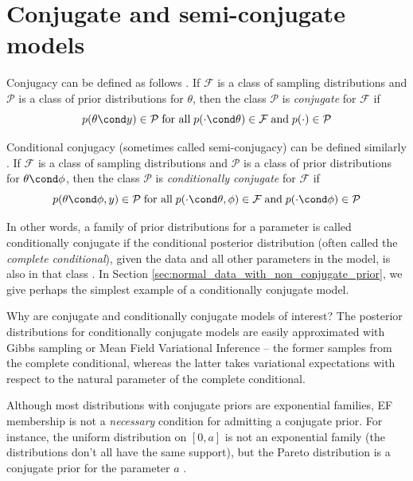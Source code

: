 \documentclass{article} %
\begin{document}
 \section{Conjugate and semi-conjugate models} \label{sec:conjugate_exponential_family_models}
 
Conjugacy can be defined as follows \cite{gelman2013bayesian}. If $\mathcal{F}$ is a class of sampling distributions and $\mathcal{P}$ is a class of prior distributions for $\theta$, then the class $\mathcal{P}$ is \textit{conjugate} for $\mathcal{F}$ if
\[  p(\theta \cond y ) \in \mathcal{P} \; \text{for all} \; p(\cdot \cond \theta) \in \mathcal{F} \; \text{and} \; p(\cdot) \in \mathcal{P} \]

Conditional conjugacy (sometimes called semi-conjugacy) can be defined similarly  \cite{gelman2013bayesian}.  If $\mathcal{F}$ is a class of sampling distributions and $\mathcal{P}$ is a class of prior distributions for $\theta \cond \phi$, then the class $\mathcal{P}$ is \textit{conditionally conjugate} for $\mathcal{F}$ if
\[  p(\theta \cond \phi, y) \in \mathcal{P} \; \text{for all} \; p(\cdot \cond \theta, \phi) \in \mathcal{F} \; \text{and} \; p(\cdot \cond \phi) \in \mathcal{P} \]

\begin{remark}{}
In other words,  a family of prior distributions for a parameter is called conditionally conjugate if the conditional posterior distribution (often called the \textit{complete conditional}),  given the data and all other parameters in the model,  is also in that class  \cite{gelman2006prior}.     In Section \ref{sec:normal_data_with_non_conjugate_prior}, we give perhaps the simplest example of a conditionally conjugate model.
 
\end{remark}
 
 Why are conjugate and conditionally conjugate models of interest?  The posterior distributions for conditionally conjugate models are easily approximated with Gibbs sampling or Mean Field Variational Inference -- the former samples from the complete conditional,  whereas the latter takes variational expectations with respect to the natural parameter of the complete conditional.   
 
 \begin{remark}
 Although most distributions with conjugate priors are exponential families, EF membership is not a \textit{necessary} condition for admitting a conjugate prior.  For instance, the uniform distribution on $[0,a]$ is not an exponential family (the distributions don't all have the same support), but the Pareto distribution is a conjugate prior for the parameter $a$ \cite{minkaXXXXbayesian}.  
 \end{remark}
 	
\end{document}
